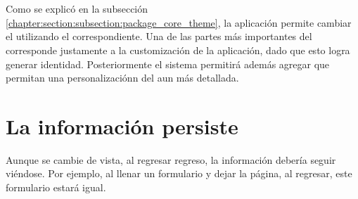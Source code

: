 \section{\themesCPT}

Como se explicó en la subsección \ref{chapter:section:subsection:package_core_theme}, la aplicación permite cambiar el \themeCPT utilizando el \packageAS correspondiente.
Una de las partes más importantes del \frameworkPC \ecommerceCOM corresponde justamente a la customización de la aplicación, dado que esto logra generar identidad.
Posteriormente el sistema permitirá además agregar \templatesAS que permitan una personalizaciónn del \websiteINT aun más detallada.



\section{La información persiste}

Aunque se cambie de vista, al regresar regreso, la información debería seguir viéndose. Por ejemplo, al llenar un formulario  y dejar la página, al regresar, este formulario estará igual.


%


